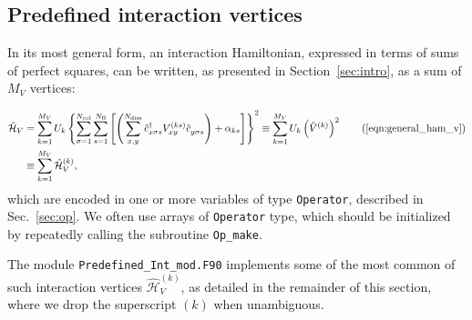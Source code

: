 %
\subsection{Predefined interaction vertices} \label{sec:interaction_vertices}

In its most general form, an interaction Hamiltonian, expressed in terms of sums of perfect squares, can be written, as presented in Section~\ref{sec:intro}, as a sum of $M_V$ vertices: %

\begin{align*}
\hat{\mathcal{H}}_{V} &=  \sum\limits_{k=1}^{M_V}U_{k}
\left\{ \sum\limits_{\sigma=1}^{N_{\mathrm{col}}}
\sum\limits_{s=1}^{N_{\mathrm{fl}}} \left[ \left(
\sum\limits_{x,y}^{N_{\mathrm{dim}}} \hat{c}^{\dagger}_{x \sigma s}V_{xy}^{(k s)}\hat{c}^{\phantom\dagger}_{y \sigma s}\right)  +\alpha_{k s}  \right] \right\}^{2}
\equiv    \sum\limits_{k=1}^{M_V}U_{k}   \left(\hat{V}^{(k)} \right)^2 \tag{\ref{eqn:general_ham_v}}\\
&\equiv    \sum\limits_{k=1}^{M_V}\hat{\mathcal{H}}_V^{(k)},
\end{align*}
which are encoded in one or more variables of type \texttt{Operator}, described in Sec.~\ref{sec:op}. We often use arrays of \texttt{Operator} type, which should be initialized by repeatedly calling the subroutine \texttt{Op\_make}.

The module \texttt{Predefined\_Int\_mod.F90} implements some of the most common of such interaction vertices $\hat{\mathcal{H}}_V^{(k)}$, as detailed in the remainder of this section, where we drop the superscript $(k)$ when unambiguous.


